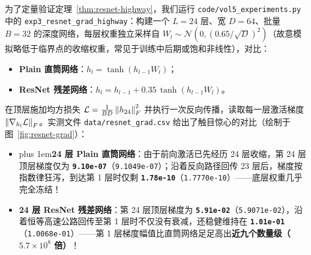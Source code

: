 为了定量验证定理~\ref{thm:resnet-highway}，我们运行 \texttt{code/vol5\_experiments.py} 中的 \texttt{exp3\_resnet\_grad\_highway}：构建一个 $L = 24$ 层、宽 $D = 64$、批量 $B = 32$ 的深度网络，每层权重独立采样自 $W_l \sim \mathcal{N}(0, (0.65/\sqrt{D})^2)$（故意模拟略低于临界点的收缩权重，常见于训练中后期或饱和非线性），对比：
\begin{itemize}
  \item \textbf{Plain 直筒网络}：$h_l = \tanh(h_{l-1} W_l)$；
  \item \textbf{ResNet 残差网络}：$h_l = h_{l-1} + 0.35\,\tanh(h_{l-1} W_l)$。
\end{itemize}
在顶层施加均方损失 $\mathcal{L} = \frac{1}{BD}\left\|h_{24}\right\|_F^2$ 并执行一次反向传播，读取每一层激活梯度 $\left\|\nabla_{h_l} \mathcal{L}\right\|_F$。实测文件 \texttt{data/resnet\_grad.csv} 给出了触目惊心的对比（绘制于图~\ref{fig:resnet-grad}）：
\begin{itemize}
  \item {\rightskip=0pt plus 1em\relax \textbf{24 层 Plain 直筒网络}：由于前向激活已先经历 24 层收缩，第 24 层顶层梯度仅为 \textbf{\texttt{9.10e-07}}（\texttt{9.1049e-07}）；沿着反向路径回传 23 层后，梯度按指数律狂泻，到达第 1 层时仅剩 \textbf{\texttt{1.78e-10}}（\texttt{1.7770e-10}）——底层权重几乎完全冻结！\par}
  \item \textbf{24 层 ResNet 残差网络}：第 24 层顶层梯度为 \textbf{\texttt{5.91e-02}}（\texttt{5.9071e-02}），沿着恒等高速公路回传至第 1 层时不仅没有衰减，还稳健维持在 \textbf{\texttt{1.01e-01}}（\texttt{1.0068e-01}）——第 1 层梯度幅值比直筒网络足足高出\textbf{近九个数量级（$5.7 \times 10^8$ 倍）}！
\end{itemize}

